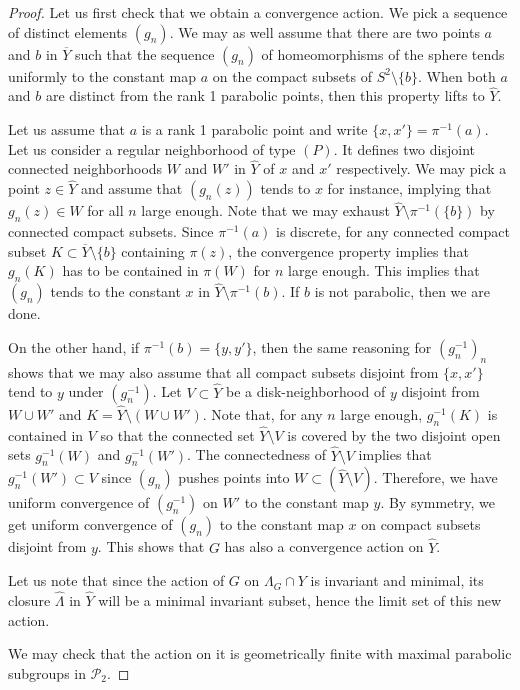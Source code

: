 \documentclass[11pt]{article}
\theoremstyle{definition}
\newcommand\PP{\mathcal{P}}
\renewcommand\hat{\widehat}
\begin{document}
\begin{proof}
Let us first check that we obtain a convergence action. We pick a sequence of distinct elements $(g_n)$. 
We may as well assume that there are two points
$a$ and $b$  in $\overline{Y}$ such that the sequence $(g_n)$ of homeomorphisms of the sphere tends uniformly to the constant map $a$ on the compact subsets of $S^2\setminus\{b\}$. 
When both $a$ and $b$ are distinct from the rank
1 parabolic points, then this property lifts to $\hat{Y}$. 

Let us assume that $a$ is a rank 1 parabolic point and write $\{x,x'\} =\pi^{-1}(a)$. Let us consider a regular neighborhood of type $(P)$. 
It defines two disjoint connected neighborhoods $W$ and $W'$ in $\hat{Y}$ of $x$ and $x'$ respectively. We may pick a point $z\in \hat{Y}$ and assume 
that $(g_n(z))$ tends to $x$ for instance, implying that $g_n(z)\in W$ for all $n$ large enough. 
Note that we may exhaust $\hat{Y}\setminus \pi^{-1}(\{b\})$ by connected compact subsets. Since $\pi^{-1}(a)$ is discrete, for any connected
compact subset $K\subset \overline{Y}\setminus \{b\}$ containing $\pi(z)$, the convergence property
implies that $g_n(K)$ has to 
be contained in $\pi(W)$ for $n$ large enough. This implies that $(g_n)$  tends to the constant $x$ in $\hat{Y}\setminus \pi^{-1}(b)$. If $b$ is not parabolic, then we are done. 

On the other hand, if $\pi^{-1}(b)=\{y,y'\}$, then the same reasoning for $(g_n^{-1})_n$ shows
that we may also assume that all compact subsets disjoint from $\{x,x'\}$ tend to $y$ under $(g_n^{-1})$. 
Let $V\subset\hat{Y}$ be a disk-neighborhood of $y$ disjoint from $W\cup W'$ 
and $K=\hat{Y}\setminus (W\cup W')$. Note that, for any $n$ large enough, $g_n^{-1}(K)$ is contained in $V$ so that the connected set $\hat{Y}\setminus V$ 
is covered by the two disjoint open sets $g_n^{-1}(W)$ and  $g_n^{-1}(W')$. The connectedness of $\hat{Y}\setminus V$ implies that
$g_n^{-1}(W')\subset V$ since $(g_n)$ pushes points into $W\subset (\hat{Y}\setminus V)$. Therefore, we have uniform convergence of $(g_n^{-1})$ on $W'$ to the constant map $y$. By symmetry, we get uniform convergence of $(g_n)$ to the constant map $x$ on compact subsets
disjoint from $y$. This shows that $G$ has also a convergence action on $\hat{Y}$. 


Let us note that since the action of $G$ on  $\Lambda_G\cap Y$ is invariant and minimal, its closure $\hat{\Lambda}$ in $\hat{Y}$ will be a minimal invariant subset, hence
the limit set of this new action. 

We may check that the action on it is geometrically finite with maximal parabolic subgroups in $\PP_2$. 
\end{proof}
\end{document}
